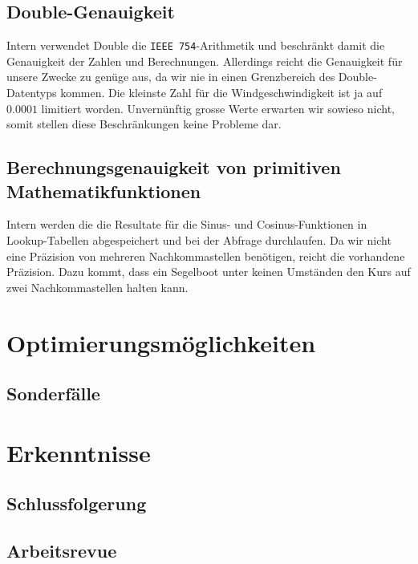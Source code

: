 \subsection{Double-Genauigkeit}
Intern verwendet Double die \texttt{IEEE 754}-Arithmetik und beschränkt damit
die Genauigkeit der Zahlen und Berechnungen. Allerdings reicht die Genauigkeit
für unsere Zwecke zu genüge aus, da wir nie in einen Grenzbereich des
Double-Datentyps kommen. Die kleinste Zahl für die Windgeschwindigkeit ist ja
auf $0.0001$ limitiert worden. Unvernünftig grosse Werte erwarten wir sowieso
nicht, somit stellen diese Beschränkungen keine Probleme dar.

\subsection{Berechnungsgenauigkeit von primitiven Mathematikfunktionen}
Intern werden die die Resultate für die Sinus- und Cosinus-Funktionen in
Lookup-Tabellen abgespeichert und bei der Abfrage durchlaufen. Da wir nicht
eine Präzision von mehreren Nachkommastellen benötigen, reicht die vorhandene
Präzision. Dazu kommt, dass ein Segelboot unter keinen Umständen den Kurs auf
zwei Nachkommastellen halten kann.

\section{Optimierungsmöglichkeiten}
\subsection{Sonderfälle}

\section{Erkenntnisse}
\subsection{Schlussfolgerung}
\subsection{Arbeitsrevue}
